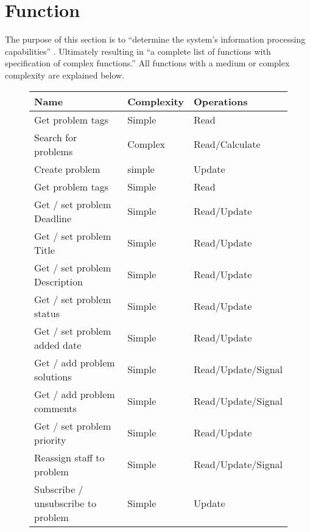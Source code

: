 \section{Function}
\label{sec:function}

The purpose of this section is to ``determine the system's information processing capabilities'' \cite[p.~137]{roedeaalborg}. Ultimately resulting in ``a complete list of functions with specification of complex functions.'' \cite[p.~137]{roedeaalborg} 
All functions with a medium or complex complexity are explained below.



\begin{figure}[hpt] %
\begin{center}
\begin{tabular}{|l|l|l|}
\hline
\textbf{Name}								&\textbf{Complexity} & \textbf{Operations}   \\ \hline%
Get problem tags						&   Simple & Read   \\ \hline%
Search for problems 				&  Complex & Read/Calculate   \\ \hline%
Create problem 							&   simple & Update   \\ \hline%
Get problem tags 						&   Simple & Read   \\ \hline%
Get / set problem Deadline 	&   Simple & Read/Update  \\ \hline%
Get / set problem Title 		&   Simple & Read/Update   \\ \hline%
Get / set problem Description & Simple & Read/Update   \\ \hline%
Get / set problem status 		&   Simple & Read/Update   \\ \hline%
Get / set problem added date& 	Simple & Read/Update   \\ \hline%
Get / add problem solutions &   Simple & Read/Update/Signal   \\ \hline%
Get / add problem comments 	&   Simple & Read/Update/Signal   \\ \hline%
Get / set problem priority 	&   Simple & Read/Update   \\ \hline%
Reassign staff to problem 	&   Simple & Read/Update/Signal   \\ \hline%
Subscribe / unsubscribe  to problem 	&   Simple & Update   \\ \hline%

\end{tabular}
\end{center}
\end{figure}
